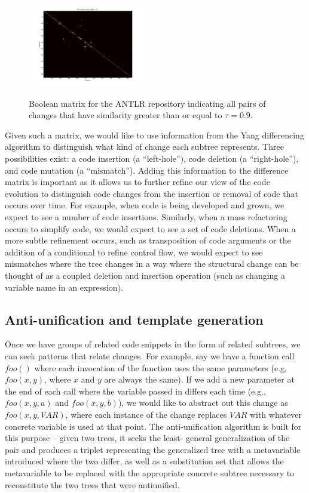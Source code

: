 \begin{figure}
\begin{center}
\includegraphics[width=0.45\textwidth]{figures/distmatrix-0-9.png}
\label{fig:boolmat}
\caption{Boolean matrix for the ANTLR repository indicating all pairs of
changes that have similarity greater than or equal to $\tau = 0.9$.}
\end{center}
\end{figure}

Given such a matrix, we would like to use information from the Yang
differencing algorithm to distinguish what kind of change each subtree
represents.  Three possibilities exist: a code insertion (a ``left-hole''),
code deletion (a ``right-hole''), and code mutation (a ``mismatch'').  Adding
this information to the difference matrix is important as it allows us to
further refine our view of the code evolution to distinguish code changes from
the insertion or removal of code that occurs over time. For example, when code
is being developed and grown, we expect to see a number of code insertions.
Similarly, when a mass refactoring occurs to simplify code, we would expect to
see a set of code deletions.  When a more subtle refinement occurs, such as
transposition of  code arguments or the addition of a conditional to refine
control flow, we would expect to see mismatches where the tree changes in a
way where the structural change can be thought of as a  coupled deletion and
insertion operation (such as changing a variable name in an expression).

\subsection{Anti-unification and template generation}

Once we have groups of related code snippets in the form of related subtrees,
we can seek patterns that relate changes.  For example, say we have a function
call $foo()$ where each invocation of the function uses the same parameters
(e.g, $foo(x,y)$, where $x$ and $y$ are always the same). If we add a new
parameter at the end of each call where the variable passed in differs each
time (e.g., $foo(x,y,a)$ and $foo(x,y,b)$), we would like to abstract out this
change as $foo(x,y,VAR)$, where each instance of the change replaces $VAR$
with whatever concrete variable is used at that point.  The anti-unification
algorithm is built for this purpose -- given two trees, it seeks the least-
general generalization of the pair and produces a triplet representing the
generalized tree with a metavariable introduced where the two differ, as well
as a substitution set that allows the metavariable to be replaced with the
appropriate concrete subtree necessary to reconstitute the two trees that were
antiunified.
